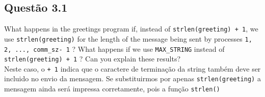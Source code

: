 
\subsection{Questão 3.1}

What happens in the greetings program if, instead of \texttt{strlen(greeting) + 1}, we use \texttt{strlen(greeting)} for the length of the message being sent by processes \texttt{1, 2, ..., comm\_sz- 1} ? What happens if we use \texttt{MAX\_STRING} instead of \texttt{strlen(greeting) + 1} ? Can you explain these results?\\

Neste caso, o \texttt{+ 1} indica que o caractere de terminação da string também deve ser incluido no envio da mensagem. Se substituirmos por apenas  \texttt{strlen(greeting)} a mensagem ainda será impressa corretamente, pois a função \texttt{strlen()} 

